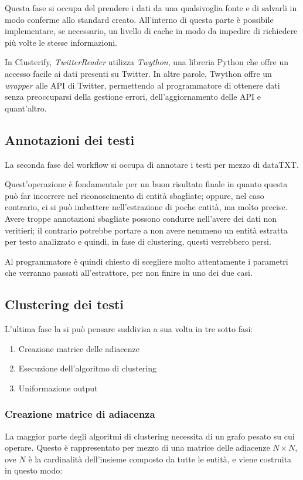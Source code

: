 		Questa fase si occupa del prendere i dati da una qualsivoglia fonte e di salvarli in modo conferme allo standard creato. All'interno di questa parte è possibile implementare, se necessario, un livello di cache in modo da impedire di richiedere più volte le stesse informazioni.

		In Clusterify, \emph{TwitterReader} utilizza \emph{Twython}, una libreria Python che offre un accesso facile ai dati presenti su Twitter\cite{twython}. In altre parole, Twython offre un \emph{wrapper} alle API di Twitter, permettendo al programmatore di ottenere dati senza preoccuparsi della gestione errori, dell'aggiornamento delle API e quant'altro. 

	\subsection{Annotazioni dei testi}
		La seconda fase del workflow si occupa di annotare i testi per mezzo di dataTXT.
		
		Quest'operazione è fondamentale per un buon risultato finale in quanto questa può far incorrere nel riconoscimento di entità sbagliate; oppure, nel caso contrario, ci si può imbattere nell'estrazione di poche entità, ma molto precise. Avere troppe annotazioni sbagliate possono condurre nell'avere dei dati non veritieri; il contrario potrebbe portare a non avere nemmeno un entità estratta per testo analizzato e quindi, in fase di clustering, questi verrebbero persi.

		Al programmatore è quindi chiesto di scegliere molto attentamente i parametri che verranno passati all'estrattore, per non finire in uno dei due casi.

	\subsection{Clustering dei testi}
		L'ultima fase la si può pensare suddivisa a sua volta in tre sotto fasi:

		\begin{enumerate}
  			\item Creazione matrice delle adiacenze
  			\item Esecuzione dell'algoritmo di clustering
 			\item Uniformazione output
		\end{enumerate} 

		\subsubsection{Creazione matrice di adiacenza}
			La maggior parte degli algoritmi di clustering necessita di un grafo pesato su cui operare. Questo è rappresentato per mezzo di una matrice delle adiacenze $N \times N$, ove $N$ è la cardinalità dell'insieme composto da tutte le entità, e viene costruita in questo modo:

